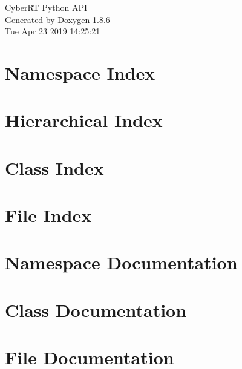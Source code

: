 \documentclass[twoside]{book}
\newcommand{\clearemptydoublepage}{%
  \newpage{\pagestyle{empty}\cleardoublepage}%
}
\begin{document}
\hypersetup{pageanchor=false}
\begin{titlepage}
\vspace*{7cm}
\begin{center}%
{\Large Cyber\-R\-T Python A\-P\-I }\\
\vspace*{1cm}
{\large Generated by Doxygen 1.8.6}\\
\vspace*{0.5cm}
{\small Tue Apr 23 2019 14:25:21}\\
\end{center}
\end{titlepage}
\clearemptydoublepage
\tableofcontents
\clearemptydoublepage
{}
\hypersetup{pageanchor=true}

\chapter{Namespace Index}

\chapter{Hierarchical Index}

\chapter{Class Index}

\chapter{File Index}

\chapter{Namespace Documentation}






\chapter{Class Documentation}












\chapter{File Documentation}






\newpage
{}
{}
\printindex
\end{document}
